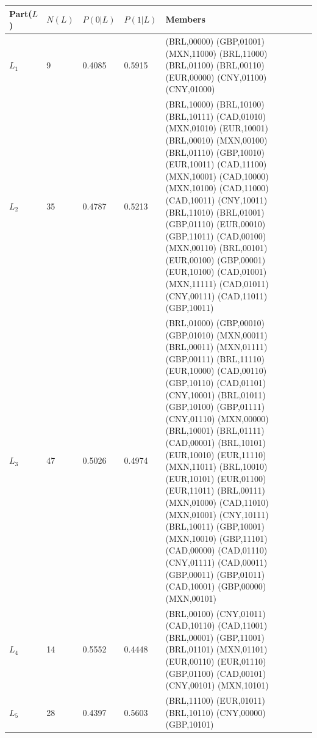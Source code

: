 \begin{tabular}{lllll}
\toprule
Part($L$) & $N(L)$ & $P(0|L)$ & $P(1|L)$ & Members \\
\midrule
$L_{1}$ & 9 & 0.4085 & 0.5915 &
  \begin{minipage}[t]{0.55\textwidth}\raggedright\scriptsize
  (BRL,00000) (GBP,01001) (MXN,11000) (BRL,11000) (BRL,01100)
  (BRL,00110) (EUR,00000) (CNY,01100) (CNY,01000)
  \end{minipage} \\[2pt]
$L_{2}$ & 35 & 0.4787 & 0.5213 &
  \begin{minipage}[t]{0.55\textwidth}\raggedright\scriptsize
  (BRL,10000) (BRL,10100) (BRL,10111) (CAD,01010) (MXN,01010)
  (EUR,10001) (BRL,00010) (MXN,00100) (BRL,01110) (GBP,10010)
  (EUR,10011) (CAD,11100) (MXN,10001) (CAD,10000) (MXN,10100)
  (CAD,11000) (CAD,10011) (CNY,10011) (BRL,11010) (BRL,01001)
  (GBP,01110) (EUR,00010) (GBP,11011) (CAD,00100) (MXN,00110)
  (BRL,00101) (EUR,00100) (GBP,00001) (EUR,10100) (CAD,01001)
  (MXN,11111) (CAD,01011) (CNY,00111) (CAD,11011) (GBP,10011)
  \end{minipage} \\[2pt]
$L_{3}$ & 47 & 0.5026 & 0.4974 &
  \begin{minipage}[t]{0.55\textwidth}\raggedright\scriptsize
  (BRL,01000) (GBP,00010) (GBP,01010) (MXN,00011) (BRL,00011)
  (MXN,01111) (GBP,00111) (BRL,11110) (EUR,10000) (CAD,00110)
  (GBP,10110) (CAD,01101) (CNY,10001) (BRL,01011) (GBP,10100)
  (GBP,01111) (CNY,01110) (MXN,00000) (BRL,10001) (BRL,01111)
  (CAD,00001) (BRL,10101) (EUR,10010) (EUR,11110) (MXN,11011)
  (BRL,10010) (EUR,10101) (EUR,01100) (EUR,11011) (BRL,00111)
  (MXN,01000) (CAD,11010) (MXN,01001) (CNY,10111) (BRL,10011)
  (GBP,10001) (MXN,10010) (GBP,11101) (CAD,00000) (CAD,01110)
  (CNY,01111) (CAD,00011) (GBP,00011) (GBP,01011) (CAD,10001)
  (GBP,00000) (MXN,00101)
  \end{minipage} \\[2pt]
$L_{4}$ & 14 & 0.5552 & 0.4448 &
  \begin{minipage}[t]{0.55\textwidth}\raggedright\scriptsize
  (BRL,00100) (CNY,01011) (CAD,10110) (CAD,11001) (BRL,00001)
  (GBP,11001) (BRL,01101) (MXN,01101) (EUR,00110) (EUR,01110)
  (GBP,01100) (CAD,00101) (CNY,00101) (MXN,10101)
  \end{minipage} \\[2pt]
$L_{5}$ & 28 & 0.4397 & 0.5603 &
  \begin{minipage}[t]{0.55\textwidth}\raggedright\scriptsize
  (BRL,11100) (EUR,01011) (BRL,10110) (CNY,00000) (GBP,10101)

\end{minipage}
\end{tabular}
